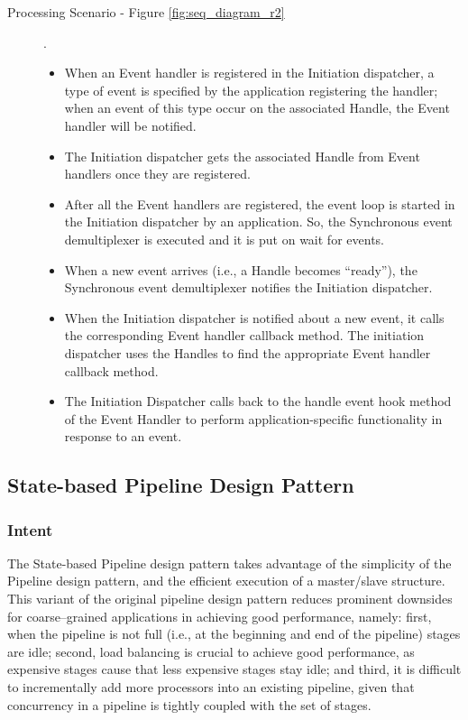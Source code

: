 \begin{description}
	\item[Processing Scenario - Figure \ref{fig:seq_diagram_r2}].\\
	
	\begin{itemize}
		\item  When an Event handler is registered in the Initiation dispatcher, a type of event is specified by the application registering the handler; when an event of this type occur on the associated Handle, the Event handler will be notified.
		
		\item  The Initiation dispatcher gets the associated Handle from Event handlers once they are registered.
		
		\item  After all the Event handlers are registered, the event loop is started in the Initiation dispatcher by an application. So, the Synchronous event demultiplexer is executed and it is put on wait for events.
		
		\item  When a new event arrives (i.e., a Handle becomes ``ready''), the Synchronous event demultiplexer notifies the Initiation dispatcher.
		
		\item  When the Initiation dispatcher is notified about a new event, it calls the corresponding Event handler callback method. The initiation dispatcher uses the Handles to find the appropriate Event handler callback method.
		
		\item  The Initiation Dispatcher calls back to the handle event hook method of the Event Handler to perform application-specific functionality in response to an event.
	\end{itemize}
\end{description}

\subsection{State-based Pipeline Design Pattern}

\subsubsection{Intent}
The State-based Pipeline design pattern takes advantage of the simplicity of the Pipeline design pattern, and the efficient execution of a master/slave structure. This variant of the original pipeline design pattern reduces prominent downsides for coarse--grained applications in achieving good performance, namely: first, when the pipeline is not full (i.e., at the beginning and end of the pipeline) stages are idle; second, load balancing is crucial to achieve good performance, as expensive stages cause that less expensive stages stay idle; and third, it is difficult to incrementally add more processors into an existing pipeline, given that concurrency in a pipeline is tightly coupled with the set of stages.

